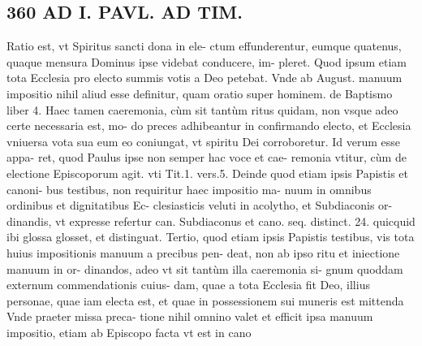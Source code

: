 \documentclass{article}
\begin{document}
\begin{pages}
\section*{360 AD I. PAVL. AD TIM. }
\marginpar{[ p.]} Ratio est, vt Spiritus sancti dona in ele- ctum effunderentur, eumque quatenus, quaque mensura Dominus ipse videbat conducere, im- pleret. Quod ipsum etiam tota Ecclesia pro electo summis votis a Deo petebat. Vnde ab August. manuum impositio nihil aliud esse definitur, quam oratio super hominem. de Baptismo liber 4.  \pend\pstart Haec tamen caeremonia, cùm sit tantùm ritus quidam, non vsque adeo certe necessaria est, mo- do preces adhibeantur in confirmando electo, et Ecclesia vniuersa vota sua eum eo coniungat, vt spiritu Dei corroboretur. Id verum esse appa- ret, quod Paulus ipse non semper hac voce et cae- remonia vtitur, cùm de electione Episcoporum agit. vti Tit.1. vers.5.  \pend\pstart Deinde quod etiam ipsis Papistis et canoni- bus testibus, non requiritur haec impositio ma- nuum in omnibus ordinibus et dignitatibus Ec- clesiasticis veluti in acolytho, et Subdiaconis or- dinandis, vt expresse refertur can. Subdiaconus et cano. seq. distinct. 24. quicquid ibi glossa glosset, et distinguat.  \pend\pstart Tertio, quod etiam ipsis Papistis testibus, vis tota huius impositionis manuum a precibus pen- deat, non ab ipso ritu et iniectione manuum in or- dinandos, adeo vt sit tantùm illa caeremonia si- gnum quoddam externum commendationis cuius- dam, quae a tota Ecclesia fit Deo, illius personae, quae iam electa est, et quae in possessionem sui muneris est mittenda Vnde praeter missa preca- tione nihil omnino valet et efficit ipsa manuum impositio, etiam ab Episcopo facta vt est in cano  \pend

\end{pages}
\end{document}
